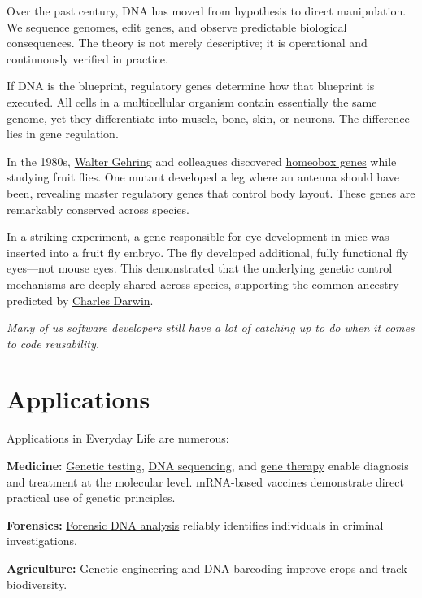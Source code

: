 Over the past century, DNA has moved from hypothesis to direct manipulation. We sequence genomes, edit genes, and observe predictable biological consequences. The theory is not merely descriptive; it is operational and continuously verified in practice.

If DNA is the blueprint, regulatory genes determine how that blueprint is executed. All cells in a multicellular organism contain essentially the same genome, yet they differentiate into muscle, bone, skin, or neurons. The difference lies in gene regulation.

In the 1980s, \href{https://en.wikipedia.org/wiki/Walter_Gehring}{Walter Gehring} and colleagues discovered \href{https://en.wikipedia.org/wiki/Homeobox}{homeobox genes} while studying fruit flies. One mutant developed a leg where an antenna should have been, revealing master regulatory genes that control body layout. These genes are remarkably conserved across species.

In a striking experiment, a gene responsible for eye development in mice was inserted into a fruit fly embryo. The fly developed additional, fully functional fly eyes—not mouse eyes. This demonstrated that the underlying genetic control mechanisms are deeply shared across species, supporting the common ancestry predicted by \href{https://en.wikipedia.org/wiki/On_the_Origin_of_Species}{Charles Darwin}.

\textit{Many of us software developers still have a lot of catching up to do when it comes to code reusability.}


\section{Applications}

Applications in Everyday Life are numerous:

\textbf{Medicine:} \href{https://en.wikipedia.org/wiki/Genetic_testing}{Genetic testing}, \href{https://en.wikipedia.org/wiki/DNA_sequencing}{DNA sequencing}, and \href{https://en.wikipedia.org/wiki/Gene_therapy}{gene therapy} enable diagnosis and treatment at the molecular level. mRNA-based vaccines demonstrate direct practical use of genetic principles.

\textbf{Forensics:} \href{https://en.wikipedia.org/wiki/Forensic_DNA_analysis}{Forensic DNA analysis} reliably identifies individuals in criminal investigations.

\textbf{Agriculture:} \href{https://en.wikipedia.org/wiki/Genetic_engineering}{Genetic engineering} and \href{https://en.wikipedia.org/wiki/DNA_barcoding}{DNA barcoding} improve crops and track biodiversity.

